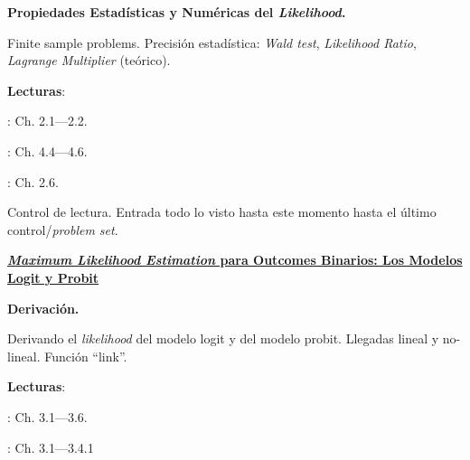 \documentclass[letterpaper]{article}
\renewenvironment{itemize}{
  \begin{list}{}{
    \setlength{\leftmargin}{1.5em}
  }
}{
  \end{list}
}
\begin{document}
\begin{enumerate}[label=\roman*.]
      \begin{itemize} 
        \item[10.] {\bf Propiedades Estad\'isticas y Num\'ericas del \emph{Likelihood}.}
        \begin{itemize} 
          \item[$\circ$] Finite sample problems. Precisi\'on estad\'istica: \emph{Wald test}, \emph{Likelihood Ratio}, \emph{Lagrange Multiplier} (te\'orico).
          \item[$\circ$] {\bf Lecturas}: 
            \begin{itemize} 
              \item[$\diamond$] \textcite{Ward2018}: Ch. 2.1---2.2. 
              \item[$\diamond$] \textcite{King1998}: Ch. 4.4---4.6.
              \item[$\diamond$] \textcite{Long2001}: Ch. 2.6.
            \end{itemize}
        \end{itemize}
      \end{itemize}

\item[{\color{red}\Pointinghand}] Control de lectura. Entrada todo lo visto hasta este momento hasta el \'ultimo control/\emph{problem set}.


\item {\bf {\color{ForestGreen}\underline{\emph{Maximum Likelihood Estimation} para Outcomes Binarios: Los Modelos Logit y Probit}}}


        \begin{itemize} 
        \item[11.] {\bf Derivaci\'on.}
        \begin{itemize} 
          \item[$\circ$] Derivando el \emph{likelihood} del modelo logit y del modelo probit. Llegadas lineal y no-lineal. Funci\'on ``link''.
          \item[$\circ$] {\bf Lecturas}: 
            \begin{itemize} 
              \item[$\diamond$] \textcite{Long2001}: Ch. 3.1---3.6.
              \item[$\diamond$] \textcite{Ward2018}: Ch. 3.1---3.4.1
            \end{itemize}
        \end{itemize}
      \end{itemize}


\end{enumerate}
\end{document}
